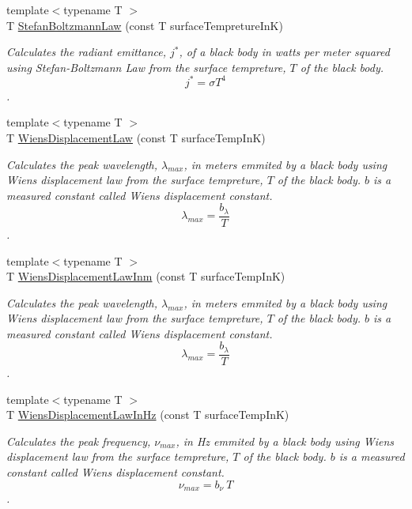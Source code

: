 \begin{DoxyCompactItemize}
{\footnotesize template$<$typename T $>$ }\\T \mbox{\hyperlink{group___e_g_x_phys-_electrodynamics-_black_body-_stefan_boltzmann_law_gadfc1c4242b5364a747169569ae5c84ef}{Stefan\+Boltzmann\+Law}} (const T surface\+Tempreture\+InK)
\begin{DoxyCompactList}\small\item\em Calculates the radiant emittance, $j^*$, of a black body in watts per meter squared using Stefan-\/\+Boltzmann Law from the surface tempreture, $T$ of the black body. \[j^*=\sigma T^4\]. \end{DoxyCompactList}\item 
{\footnotesize template$<$typename T $>$ }\\T \mbox{\hyperlink{group___e_g_x_phys-_electrodynamics-_black_body-_wiens_displacement_law_ga8f89ce1baac45a1717f604255d04af44}{Wiens\+Displacement\+Law}} (const T surface\+Temp\+InK)
\begin{DoxyCompactList}\small\item\em Calculates the peak wavelength, $\lambda_{max}$, in meters emmited by a black body using Wien\textquotesingle{}s displacement law from the surface tempreture, $T$ of the black body. $b$ is a measured constant called Wien\textquotesingle{}s displacement constant. \[\lambda_{max} = \dfrac{b_\lambda}{T} \]. \end{DoxyCompactList}\item 
{\footnotesize template$<$typename T $>$ }\\T \mbox{\hyperlink{group___e_g_x_phys-_electrodynamics-_black_body-_wiens_displacement_law_ga126ebb146c31a2371f1d1d001d11c62f}{Wiens\+Displacement\+Law\+Inm}} (const T surface\+Temp\+InK)
\begin{DoxyCompactList}\small\item\em Calculates the peak wavelength, $\lambda_{max}$, in meters emmited by a black body using Wien\textquotesingle{}s displacement law from the surface tempreture, $T$ of the black body. $b$ is a measured constant called Wien\textquotesingle{}s displacement constant. \[\lambda_{max} = \dfrac{b_\lambda}{T} \]. \end{DoxyCompactList}\item 
{\footnotesize template$<$typename T $>$ }\\T \mbox{\hyperlink{group___e_g_x_phys-_electrodynamics-_black_body-_wiens_displacement_law_gaf09ffbc9b7133c16da786c1609ecf689}{Wiens\+Displacement\+Law\+In\+Hz}} (const T surface\+Temp\+InK)
\begin{DoxyCompactList}\small\item\em Calculates the peak frequency, $\nu_{max}$, in Hz emmited by a black body using Wien\textquotesingle{}s displacement law from the surface tempreture, $T$ of the black body. $b$ is a measured constant called Wien\textquotesingle{}s displacement constant. \[\nu_{max} = b_\nu\ T \]. \end{DoxyCompactList}\item 

\end{DoxyCompactItemize}
